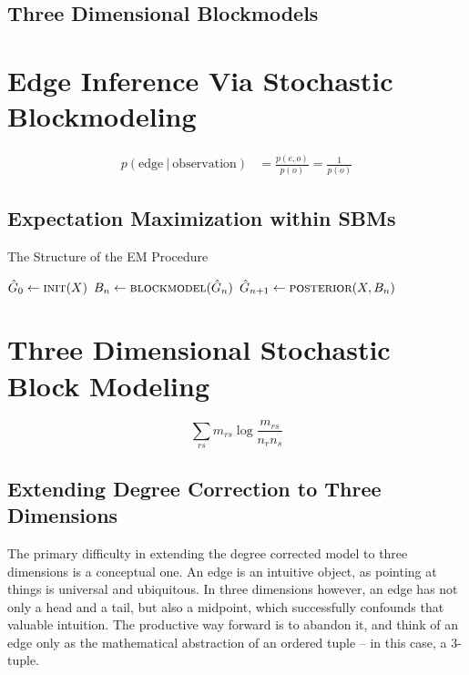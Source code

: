 \documentclass[11pt]{scrartcl}
\begin{document}
\subsection{Three Dimensional Blockmodels}


\section{Edge Inference Via Stochastic Blockmodeling}


\begin{align}
p( \text{edge} \:|\: \text{observation}) &= \frac{p(e, o)}{p(o)} = \frac{1}{p(o)}
\end{align}


\subsection{Expectation Maximization within SBMs}



\begin{algorithm}
\caption{The Structure of the EM Procedure}
\begin{algorithmic}
\State $\hat{G}_0 \gets \Call{init}{X}$
	\State $B_n \gets \Call{blockmodel}{\hat{G}_n}$ 
	\State $\hat{G}_{n+1} \gets \Call{posterior}{X, B_n}$ 
		\State {}
	\EndIf
\EndWhile
\State {}
\end{algorithmic}
\end{algorithm}


\section{Three Dimensional Stochastic Block Modeling}

\[
\sum_{rs} m_{rs} \log \frac{m_{rs}}{n_r n_s}
\]

\subsection{Extending Degree Correction to Three Dimensions}

The primary difficulty in extending the degree corrected model to three dimensions is a conceptual one. An edge is an intuitive object, as pointing at things is universal and ubiquitous. In three dimensions however, an edge has not only a head and a tail, but also a midpoint, which successfully confounds that valuable intuition. The productive way forward is to abandon it, and think of an edge only as the mathematical abstraction of an ordered tuple -- in this case, a 3-tuple. 
\end{document}
